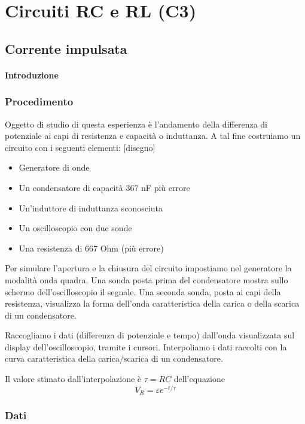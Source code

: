 \chapter{Circuiti RC e RL (C3)}

\section{Corrente impulsata}
\subsubsection{Introduzione}

\subsection{Procedimento}

Oggetto di studio di questa esperienza è l'andamento della differenza di potenziale ai capi di resistenza e capacità o induttanza.
A tal fine costruiamo un circuito con i seguenti elementi:
[disegno]

\begin{itemize}
  \item Generatore di onde
  \item Un condensatore di capacità 367 nF più errore
  \item Un'induttore di induttanza sconosciuta
  \item Un oscilloscopio con due sonde
  \item Una resistenza di 667 Ohm (più errore)
\end{itemize}

Per simulare l'apertura e la chiusura del circuito impostiamo nel generatore la modalità onda quadra. Una sonda posta prima del condensatore mostra sullo schermo dell'oscilloscopio il segnale.  
Una seconda sonda, posta ai capi della resistenza, visualizza la forma dell'onda caratteristica della carica o della scarica di un condensatore.

Raccogliamo i dati (differenza di potenziale e tempo) dall'onda visualizzata sul display dell'oscilloscopio, tramite i cursori. Interpoliamo i dati raccolti con la curva caratteristica della carica/scarica di un condensatore.

Il valore stimato dall'interpolazione è $\tau=RC$ dell'equazione
$$V_R = \varepsilon e^{-t/\tau}$$

\subsection{Dati}


